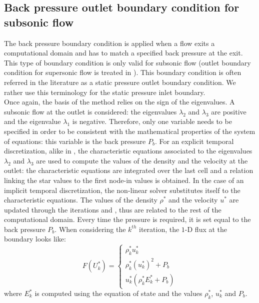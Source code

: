 \subsection{Back pressure outlet boundary condition for subsonic flow} \label{sec:static_pressure_bc}
The back pressure boundary condition is applied when a flow exits a computational domain and has to match a specified back pressure at the exit. This type of boundary condition is only valid for subsonic flow (outlet boundary condition for supersonic flow is treated in ). This boundary condition is often referred in the literature as a static pressure outlet boundary condition. We rather use this terminology for the static pressure inlet boundary.\\
Once again, the basis of the method relies on the sign of the eigenvalues. A subsonic flow at the outlet is considered: the eigenvalues $\lambda_2$ and $\lambda_3$ are positive and the eigenvalue $\lambda_1$ is negative. Therefore, only one variable needs to be specified in order to be consistent with the mathematical properties of the system of equations: this variable is the back pressure $P_b$. For an explicit temporal discretization, alike in \cite{SEM}, the characteristic equations associated to the eigenvalues $\lambda_2$ and $\lambda_3$ are used to compute the values of the density and the velocity at the outlet: the characteristic equations are integrated over the last cell and a relation linking the star values to the first node-in values is obtained. In the case of an implicit temporal discretization, the non-linear solver substitutes itself to the characteristic equations. The values of the density $\rho^*$ and the velocity $u^*$ are updated through the iterations and , thus are related to the rest of the computational domain. Every time the pressure is required, it is set equal to the back pressure $P_b$. When considering the $k^{th}$ iteration, the $1$-D  flux at the boundary looks like:
\begin{equation}
F(U^*_k) = \left\{
\begin{array}{ccc}
\rho^*_k u^*_k \\
\rho^*_k (u^*_k)^2 + P_b \\
u^*_k \left( \rho^*_k E^*_k + P_b\right)
\end{array}
\right.
\end{equation}
where $E^*_k$ is computed using the equation of state and the values $\rho^*_k$, $u^*_k$ and $P_b$.
